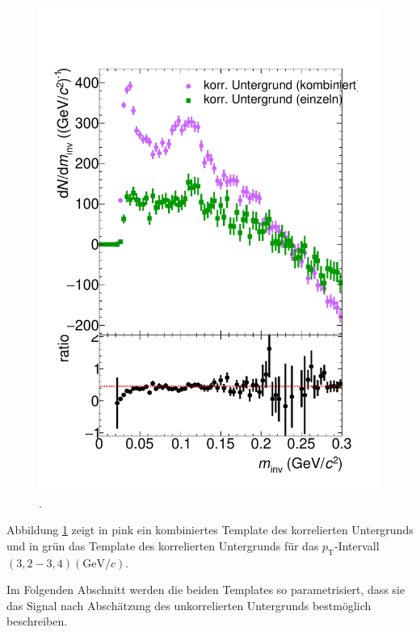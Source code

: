 \begin{figure}[tp]
\centering
\includegraphics[width=.75\linewidth]{BackgroundWithRatio10_Data_2016.pdf}
\caption{.}
\label{fig:BkgTempRatio}
\end{figure}
\newline
Abbildung \ref{fig:BkgTempRatio} zeigt in pink ein kombiniertes Template des korrelierten Untergrunds und in gr\"un das Template des korrelierten Untergrunds f\"ur das $p_\text{T}$-Intervall $(3,2 - 3,4) (\text{GeV/}c)$.

\newline
Im Folgenden Abschnitt werden die beiden Templates so parametrisiert, dass sie das Signal nach Absch\"atzung des unkorrelierten Untergrunds bestm\"oglich beschreiben.
